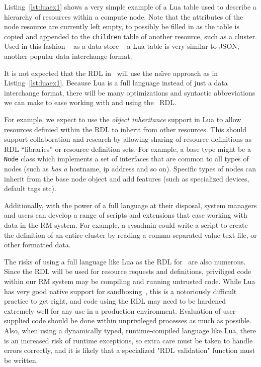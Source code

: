 Listing~\ref{lst:luaex1} shows a very simple example of
a Lua table used to describe a hierarchy of resources within
a compute node. Note that the attributes of the node resource
are currently left empty, to possibly be filled in as the
table is copied and appended to the {\tt children} table
of another resource, such as a cluster. Used in this fashion --
as a data store -- a Lua table is very similar to JSON, another
popular data interchange format.

It is not expected that the RDL in \ngrm\ will use the na\"{\i}ve
approach as in Listing~\ref{lst:luaex1}. Because Lua is a full
language instead of just a data interchange format, there will be
many optimizations and syntactic abbreviations we can make to ease
working with and using the \ngrm\ RDL.

For example, we expect to use the \emph{object inheritance} support
in Lua to allow resources definied within the RDL to inherit from
other resources. This should support collaboration and research
by allowing sharing of resource definitions as RDL ``libraries''
or resource definition sets. For example, a base type might be
a {\tt Node} class which implements a set of interfaces that are
common to all types of nodes (such as \emph{has a} hostname, ip
address and so on). Specific types of nodes can inherit from the
base node object and add features (such as specialized devices,
default tags etc).

Additionally, with the power of a full language at their disposal,
system managers and users can develop a range of scripts and
extensions that ease working with data in the RM system. For
example, a sysadmin could write a script to create the definition
of an entire cluster by reading a comma-separated value text file,
or other formatted data.

The risks of using a full language like Lua as the RDL for \ngrm\
are also numerous. Since the RDL will be used for resource
requests and definitions, priviliged code within our RM system
may be compiling and running untrusted code. While Lua has very
good native support for sandboxing~\cite{LuaSandbox}, this is
a notoriously difficult practice to get right, and code using
the RDL may need to be hardened extremely well for any use in a
production environment. Evaluation of user-supplied code should
be done within unprivileged processes as much as possible. Also,
when using a dynamically typed, runtime-compiled language like Lua,
there is an increased risk of runtime exceptions, so extra care
must be taken to handle errors correctly, and it is likely that
a specialized "RDL validation" function must be written.


